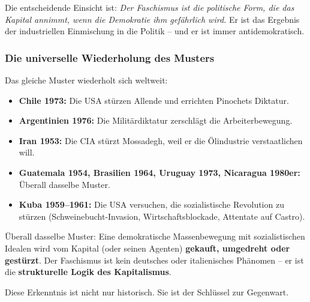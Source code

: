 Die entscheidende Einsicht ist: \emph{Der Faschismus ist die politische Form, die das Kapital annimmt, wenn die Demokratie ihm gefährlich wird.} Er ist das Ergebnis der industriellen Einmischung in die Politik – und er ist immer antidemokratisch.

\subsubsection{Die universelle Wiederholung des Musters}

Das gleiche Muster wiederholt sich weltweit:

\begin{itemize}
    \item \textbf{Chile 1973:} Die USA stürzen Allende und errichten Pinochets Diktatur.
    \item \textbf{Argentinien 1976:} Die Militärdiktatur zerschlägt die Arbeiterbewegung.
    \item \textbf{Iran 1953:} Die CIA stürzt Mossadegh, weil er die Ölindustrie verstaatlichen will.
    \item \textbf{Guatemala 1954, Brasilien 1964, Uruguay 1973, Nicaragua 1980er:} Überall dasselbe Muster.
    \item \textbf{Kuba 1959--1961:} Die USA versuchen, die sozialistische Revolution zu stürzen (Schweinebucht-Invasion, Wirtschaftsblockade, Attentate auf Castro).
\end{itemize}

Überall dasselbe Muster: Eine demokratische Massenbewegung mit sozialistischen Idealen wird vom Kapital (oder seinen Agenten) \textbf{gekauft, umgedreht oder gestürzt}. Der Faschismus ist kein deutsches oder italienisches Phänomen – er ist die \textbf{strukturelle Logik des Kapitalismus}.

Diese Erkenntnis ist nicht nur historisch. Sie ist der Schlüssel zur Gegenwart.